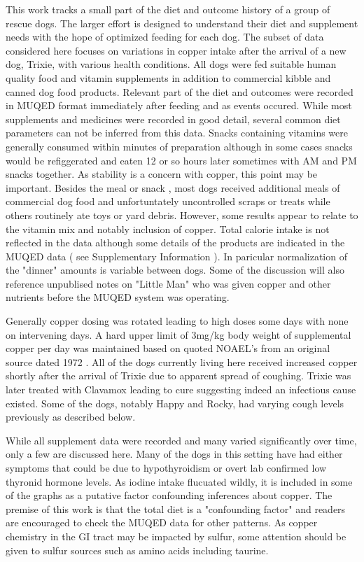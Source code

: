 This work tracks a small part of the diet and outcome history of a group
of rescue dogs. %
The larger effort is designed to understand their diet and
supplement needs with the hope of optimized feeding for each dog.
The subset of data considered here focuses on variations in copper
intake after the arrival of a new dog, Trixie, with various health
conditions.  
All dogs were fed suitable human quality food and vitamin supplements
in addition to commercial kibble and canned dog food products. 
Relevant part of the diet and outcomes were recorded  in MUQED format
\cite{mmarchywka-MJM-2020-004-.012rg} immediately
after feeding and as events occured. 
While most supplements and medicines were recorded 
in good detail, several common diet parameters can not be inferred
from this data.
Snacks containing vitamins were generally consumed within minutes
of preparation although in some cases snacks would be refiggerated
and eaten 12 or so hours later sometimes with AM and PM snacks together.
As stability is a concern with copper, this point may be important.
Besides the meal or snack ,
most dogs received additional meals of commercial dog food
and unfortuntately uncontrolled scraps or treats while others
routinely ate toys or yard debris. However, some 
results appear to relate to the vitamin mix and notably
inclusion of  copper. Total calorie intake is not reflected in
the data although some details of the products are indicated
in the MUQED data ( see Supplementary Information ).   
In paricular normalization of the "dinner" amounts is variable
between dogs.
Some of the discussion will also reference unpublised notes
on "Little Man" who was given copper and other 
nutrients before the MUQED system was operating.

Generally copper dosing was rotated leading to high doses
some days with none on intervening days. 
A hard upper limit of
3mg/kg body weight of supplemental copper per day was maintained  based 
on quoted NOAEL's from an  
original source dated  1972 \cite{NAP9782}.
All of the dogs currently living here received increased copper
shortly after the arrival of Trixie due to apparent
spread of coughing. Trixie was later treated with Clavamox
leading to cure suggesting indeed an infectious cause existed. 
Some of the dogs, notably Happy and Rocky, had varying cough levels
previously as described below. 

While all supplement data were recorded and many varied
significantly over time, only a few are discussed here. 
Many of the dogs in this setting have had either symptoms
that could be due to hypothyroidism or overt lab confirmed
low thyronid hormone levels. As iodine intake flucuated 
wildly, it is included in some of the graphs as 
a putative factor confounding inferences about copper. 
The premise of this work is that the total diet is
a "confounding factor" and readers are encouraged to check
the MUQED data for other patterns. As copper chemistry in the
GI tract may be impacted by sulfur, some attention should
be given to sulfur sources such as amino acids including taurine.  


